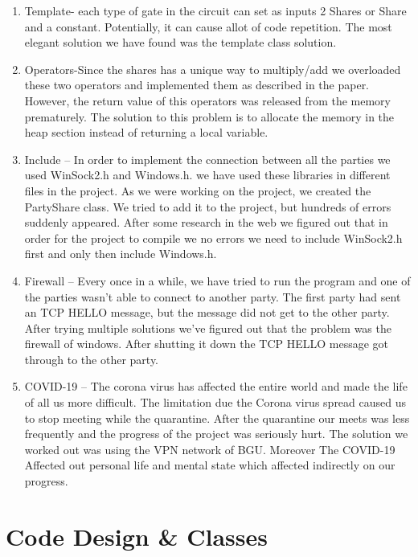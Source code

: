 \documentclass[12pt]{article}
\begin{document}
\begin{enumerate}
	\item Template- each type of gate in the circuit can set as inputs 2 Shares or Share and a constant. Potentially, it can cause allot of code repetition. The most elegant solution we have found was the template class solution. 
	\item Operators-Since the shares has a unique way to multiply/add we overloaded these two operators and implemented them as described in the paper. However, the return value of this operators was released from the memory prematurely. The solution to this problem is to allocate the memory in the heap section instead of returning a local variable. 
	\item Include – In order to implement the connection between all the parties we used WinSock2.h and Windows.h. we have used these libraries in different files in the project. As we were working on the project, we created the PartyShare class. We tried to add it to the project, but hundreds of errors suddenly appeared. After some research in the web we figured out that in order for the project to compile we no errors we need to include WinSock2.h first and only then include Windows.h.
	
	\item Firewall – Every once in a while, we have tried to run the program and one of the parties wasn't able to connect to another party. The first party had sent an TCP HELLO message, but the message did not get to the other party. After trying multiple solutions we've figured out that the problem was the firewall of windows. After shutting it down the TCP HELLO message got through to the other party.	
	\item COVID-19 – The corona virus has affected the entire world and made the life of all us more difficult. The limitation due the Corona virus spread caused us to stop meeting while the quarantine. After the quarantine our meets was less frequently and the progress of the project was seriously hurt. The solution we worked out was using the VPN network of BGU. Moreover The COVID-19 Affected out personal life and mental state which affected indirectly on our progress.
	
\end{enumerate}

\pagebreak
\section{Code Design \& Classes}
\end{document}

